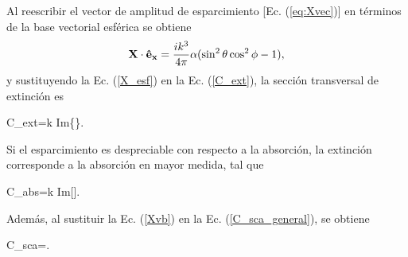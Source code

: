 Al reescribir el vector de amplitud de esparcimiento [Ec. (\ref{eq:Xvec})] en términos de la base vectorial esférica se obtiene \cite{bohrenAbsorptionScatteringLight2008}
%
\begin{equation}
	\vb{X}\cdot\vb{\hat{e}_x}=\frac{ik^3}{4\pi}\alpha(\sin^2\theta\cos^2\phi-1),  
	\label{X_esf}
\end{equation}
%
y sustituyendo la Ec. (\ref{X_esf}) en la Ec. (\ref{C_ext}), la sección transversal de extinción es
%
\begin{tcolorbox}
	C_{ext}=k\: \mbox{Im}\{\alpha\}.
\end{tcolorbox}
%
Si el esparcimiento es despreciable con respecto a la absorción, la extinción corresponde a la absorción en mayor medida, tal que \cite{bohrenAbsorptionScatteringLight2008}
%
\begin{tcolorbox}
	C_{abs}=k\: \mbox{Im}[\alpha].    
\end{tcolorbox}
Además, al sustituir la Ec. (\ref{Xvb}) en la Ec. (\ref{C_sca_general}), se obtiene \cite{bohrenAbsorptionScatteringLight2008}
%
\begin{tcolorbox}
	C_{sca}=.    
\end{tcolorbox}
